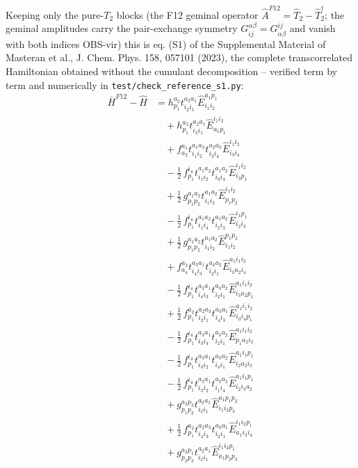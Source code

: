 \documentclass[11pt]{article}
\begin{document}
Keeping only the pure-$T_2$ blocks (the F12 geminal operator $\hat A^{F12} = \hat T_2 - \hat T_2^\dagger$;  the geminal amplitudes carry the pair-exchange symmetry $G^{\alpha\beta}_{ij} = G^{ij}_{\alpha\beta}$ and vanish with both indices OBS-vir) this is eq. (S1) of the Supplemental Material of Masteran et al., J. Chem. Phys. 158, 057101 (2023), the complete transcorrelated Hamiltonian obtained without the cumulant decomposition -- verified term by term and numerically in \texttt{test/check\_reference\_s1.py}:
\begin{align}
\bar H^{F12} - \hat H &= h^{a_{2}}_{p_{1}} t^{a_{2}a_{1}}_{i_{2}i_{1}} \hat{E}^{a_{1}p_{1}}_{i_{1}i_{2}} \\
&\quad + h^{a_{2}}_{p_{1}} t^{a_{2}a_{1}}_{i_{2}i_{1}} \hat{E}^{i_{1}i_{2}}_{a_{1}p_{1}} \\
&\quad + f^{a_{1}}_{a_{2}} t^{a_{1}a_{3}}_{i_{1}i_{2}} t^{a_{2}a_{3}}_{i_{3}i_{4}} \hat{E}^{i_{1}i_{2}}_{i_{3}i_{4}} \\
&\quad - \tfrac{1}{2}\, f^{i_{4}}_{p_{1}} t^{a_{1}a_{2}}_{i_{1}i_{2}} t^{a_{1}a_{2}}_{i_{3}i_{4}} \hat{E}^{i_{1}i_{2}}_{i_{3}p_{1}} \\
&\quad + \tfrac{1}{2}\, g^{a_{1}a_{2}}_{p_{1}p_{2}} t^{a_{1}a_{2}}_{i_{1}i_{2}} \hat{E}^{i_{1}i_{2}}_{p_{1}p_{2}} \\
&\quad - \tfrac{1}{2}\, f^{i_{4}}_{p_{1}} t^{a_{1}a_{2}}_{i_{1}i_{4}} t^{a_{1}a_{2}}_{i_{2}i_{3}} \hat{E}^{i_{1}p_{1}}_{i_{2}i_{3}} \\
&\quad + \tfrac{1}{2}\, g^{a_{1}a_{2}}_{p_{1}p_{2}} t^{a_{1}a_{2}}_{i_{1}i_{2}} \hat{E}^{p_{1}p_{2}}_{i_{1}i_{2}} \\
&\quad + f^{a_{3}}_{a_{4}} t^{a_{3}a_{1}}_{i_{4}i_{3}} t^{a_{4}a_{2}}_{i_{2}i_{1}} \hat{E}^{a_{1}i_{1}i_{2}}_{i_{3}a_{2}i_{4}} \\
&\quad - \tfrac{1}{2}\, f^{i_{4}}_{p_{1}} t^{a_{3}a_{1}}_{i_{4}i_{3}} t^{a_{3}a_{2}}_{i_{2}i_{1}} \hat{E}^{a_{1}i_{1}i_{2}}_{i_{3}a_{2}p_{1}} \\
&\quad + \tfrac{1}{2}\, f^{a_{2}}_{p_{1}} t^{a_{2}a_{3}}_{i_{2}i_{1}} t^{a_{3}a_{1}}_{i_{4}i_{3}} \hat{E}^{a_{1}i_{1}i_{2}}_{i_{3}i_{4}p_{1}} \\
&\quad - \tfrac{1}{2}\, f^{i_{4}}_{p_{1}} t^{a_{3}a_{1}}_{i_{3}i_{4}} t^{a_{3}a_{2}}_{i_{2}i_{1}} \hat{E}^{a_{1}i_{1}i_{2}}_{p_{1}a_{2}i_{3}} \\
&\quad - \tfrac{1}{2}\, f^{i_{4}}_{p_{1}} t^{a_{3}a_{1}}_{i_{3}i_{2}} t^{a_{3}a_{2}}_{i_{4}i_{1}} \hat{E}^{a_{1}i_{1}p_{1}}_{i_{2}a_{2}i_{3}} \\
&\quad - \tfrac{1}{2}\, f^{i_{4}}_{p_{1}} t^{a_{3}a_{1}}_{i_{3}i_{2}} t^{a_{3}a_{2}}_{i_{1}i_{4}} \hat{E}^{a_{1}i_{1}p_{1}}_{i_{2}i_{3}a_{2}} \\
&\quad + g^{a_{2}p_{3}}_{p_{1}p_{2}} t^{a_{2}a_{1}}_{i_{2}i_{1}} \hat{E}^{a_{1}p_{1}p_{2}}_{i_{1}i_{2}p_{3}} \\
&\quad + \tfrac{1}{2}\, f^{a_{2}}_{p_{1}} t^{a_{2}a_{3}}_{i_{4}i_{3}} t^{a_{3}a_{1}}_{i_{2}i_{1}} \hat{E}^{i_{1}i_{2}p_{1}}_{a_{1}i_{3}i_{4}} \\
&\quad + g^{a_{2}p_{1}}_{p_{2}p_{3}} t^{a_{2}a_{1}}_{i_{2}i_{1}} \hat{E}^{i_{1}i_{2}p_{1}}_{a_{1}p_{2}p_{3}}
\end{align}
\end{document}
